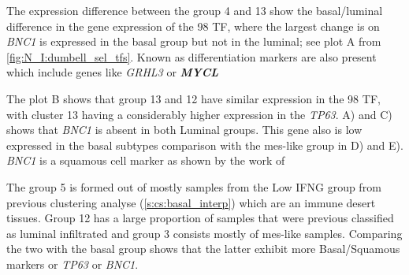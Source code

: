 The expression difference between the group 4 and 13 show the basal/luminal difference in the gene expression of the 98 TF, where the largest change is on \textit{BNC1} is expressed in the basal group but not in the luminal; see plot A from \cref{fig:N_I:dumbell_sel_tfs}. Known as differentiation markers are also present which include genes like \textit{GRHL3} \citep{Ramal2024-ha} or \textbf{\textit{MYCL}} 

The plot B shows that group 13 and 12 have similar expression in the 98 TF, with cluster 13 having a considerably higher expression in the \textit{TP63}.  A) and C) shows that \textit{BNC1} is absent in both Luminal groups. This gene also is low expressed in the basal subtypes comparison with the mes-like group in D) and E). \textit{BNC1} is a squamous cell marker as shown by the work of \citet{Hurst2022-sp}

The group 5 is formed out of mostly samples from the Low IFNG group from previous clustering analyse (\cref{s:cs:basal_interp}) which are an immune desert tissues. Group 12 has a large proportion of samples that were previous classified as luminal infiltrated and group 3 consists mostly of mes-like samples. Comparing the two with the basal group shows that the latter exhibit more Basal/Squamous markers or \textit{TP63} or \textit{BNC1}.

